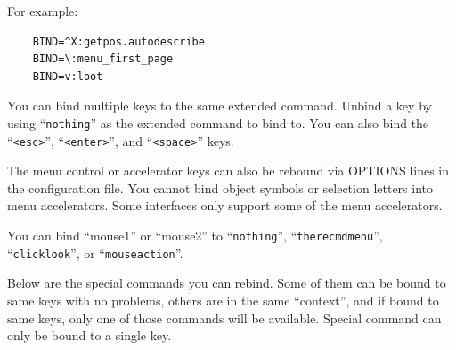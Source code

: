 \documentclass[titlepage]{article}
\begin{document}
For example:

\begin{verbatim}
    BIND=^X:getpos.autodescribe
    BIND=\:menu_first_page
    BIND=v:loot
\end{verbatim}

\begin{description}[font=\mdseries\ttfamily]
\item[Extended command keys]
You can bind multiple keys to the same extended command. Unbind a key by
using ``\texttt{nothing}'' as the extended command to bind to. You can also bind
the ``\texttt{<esc>}'', ``\texttt{<enter>}'', and ``\texttt{<space>}'' keys.

\item[Menu accelerator keys]
The menu control or accelerator keys can also be rebound via OPTIONS lines
in the configuration file.
You cannot bind object symbols or selection letters into menu accelerators.
Some interfaces only support some of the menu accelerators.

\item[Mouse buttons]
You can bind ``mouse1'' or ``mouse2'' to ``\texttt{nothing}'',
``\texttt{therecmdmenu}'', ``\texttt{clicklook}'', or ``\texttt{mouseaction}''.

\item[Special command keys]
Below are the special commands you can rebind. Some of them can be bound to
same keys with no problems, others are in the same ``context'', and if bound
to same keys, only one of those commands will be available. Special command
can only be bound to a single key.
\end{description}
\end{document}
